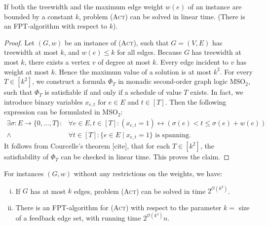 \documentclass[runningheads]{llncs}
\numberwithin{equation}{section}
\newcommand{\set}[1]{\{ #1 \}}
\newcommand{\fromto}[2]{\set{#1, \ldots, #2}}
\newcommand{\bigO}{\mathcal{O}}
\newcommand{\act}{\textsc{(Act)}}
\begin{document}
\begin{theorem}
If both the treewidth and the maximum edge weight $w(e)$ of an instance are bounded by  a constant $k$, problem {\act} can be solved in linear time. (There is an FPT-algorithm with respect to $k$). 
\end{theorem}
\begin{proof}
Let $(G, w)$ be an instance of {\act}, such that $G = (V, E)$ has treewidth at most $k$, and $w(e) \leq k$ for all edges. Because $G$ has treewidth at most $k$, there exists a vertex $v$ of degree at most $k$. Every edge incident to $v$ has weight at most $k$. Hence the maximum value of a solution is at most $k^2$. For every $T \in [k^2]$, we construct a formula $\Phi_T$ in monadic second-order graph logic $\text{MSO}_2$, such that $\Phi_T$ is satisfiable if and only if a schedule of value $T$ exists. In fact, we introduce binary variables $x_{e,t}$ for $e \in E$ and $t \in [T]$. Then the following expression can be formulated in $\text{MSO}_2$:
\begin{align*}
\exists \sigma :  E \rightarrow \fromto{0}{T} : &\forall e \in E, t \in [T]: (x_{e,t}=1) \leftrightarrow \left(\sigma(e) < t \leq \sigma(e) + w(e)\right)\\
\land &\forall t \in [T]: \set{e \in E \mid x_{e,t} = 1} \text{ is spanning.}
\end{align*}
It follows from Courcelle's theorem [cite], that for each $T \in [k^2]$, the satisfiability of $\Phi_T$ can be checked in linear time. This proves the claim.
\end{proof}

\begin{theorem}
For instances $(G, w)$ without any restrictions on the weights, we have: 
\begin{enumerate}[(i)]
\item If $G$ has at most $k$ edges, problem {\act} can be solved in time $2^{\bigO(k^2)}$.
\item There is an  FPT-algorithm for {\act} with respect to the parameter $k =$ size of a feedback edge set, with running time $2^{\bigO(k^4)}n$. 

\end{enumerate}
\end{theorem}
\end{document}
